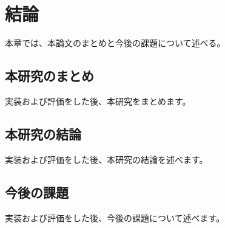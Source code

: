 \chapter{結論}
\label{chap:conclusion}
本章では、本論文のまとめと今後の課題について述べる。

\section{本研究のまとめ}
\label{section:conclusion}
実装および評価をした後、本研究をまとめます。

\section{本研究の結論}
実装および評価をした後、本研究の結論を述べます。

\section{今後の課題}
実装および評価をした後、今後の課題について述べます。